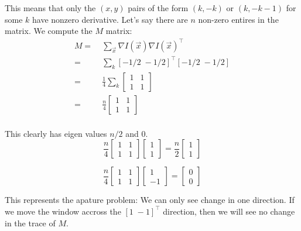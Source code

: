 \documentclass[11pt,english]{article}
\begin{document}
\begin{enumerate}
This means that only the $(x,y)$ pairs of the form $(k,-k)$ or $(k,-k-1)$ for some $k$ have nonzero derivative.
Let's say there are $n$ non-zero entires in the matrix. We compute the $M$ matrix:
\begin{align*}
M 
=&\; \sum_{\vec{x}} \nabla I(\vec{x}) \nabla I(\vec{x})^\top \\
=&\; \sum_{k} [-1/2 \; -1/2 ]^\top [ -1/2 \; -1/2 ]  \\
=&\; \frac{1}{4} \sum_{k}
        \begin{bmatrix}
           1 & 1 \\
           1 & 1 
        \end{bmatrix} \\
=&\; \frac{n}{4}  \begin{bmatrix}
           1 & 1 \\
           1 & 1 
        \end{bmatrix} \\
\end{align*}

This clearly has eigen values $n/2$ and $0$.
\[
\frac{n}{4} \begin{bmatrix}
           1 & 1 \\
           1 & 1 
   \end{bmatrix} 
 \begin{bmatrix}
           1  \\
           1  
   \end{bmatrix} =
 \frac{n}{2} \begin{bmatrix}
           1  \\
           1  
   \end{bmatrix} 
\]

\[
\frac{n}{4} \begin{bmatrix}
           1 & 1 \\
           1 & 1 
   \end{bmatrix} 
 \begin{bmatrix}
           1  \\
          -1  
   \end{bmatrix} =
   \begin{bmatrix}
           0  \\
           0  
   \end{bmatrix} 
\]

This represents the apature problem: We can only see change in one direction. If we move the window accross the
$[ 1 \; -1 ]^\top$ direction, then we will see no change in the trace of $M$. 


\end{enumerate}
\end{document}
